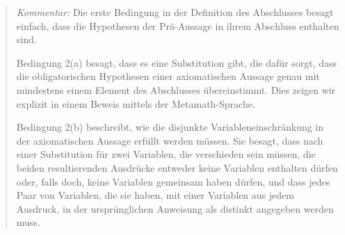 {\footnotesize\begin{quotation}
{\em Kommentar:} Die erste Bedingung in der Definition des Abschlusses besagt einfach, dass die Hypothesen der Prä-Aussage in ihrem Abschluss enthalten sind.  

Bedingung 2(a) besagt, dass es eine Substitution gibt, die dafür sorgt, dass die obligatorischen Hypothesen einer axiomatischen Aussage genau mit mindestens einem Element des Abschlusses übereinstimmt.  Dies zeigen wir explizit in einem Beweis mittels der Metamath-Sprache.

%

Bedingung 2(b) beschreibt, wie die disjunkte Variableneinschränkung in der axiomatischen Aussage erfüllt werden müssen.  Sie besagt, dass nach einer Substitution für zwei Variablen, die verschieden sein müssen, die beiden resultierenden Ausdrücke entweder keine Variablen enthalten dürfen oder, falls doch, keine Variablen gemeinsam haben dürfen, und dass jedes Paar von Variablen, die sie haben, mit einer Variablen aus jedem Ausdruck, in der ursprünglichen Anweisung als distinkt angegeben werden muss.
\end{quotation}}

